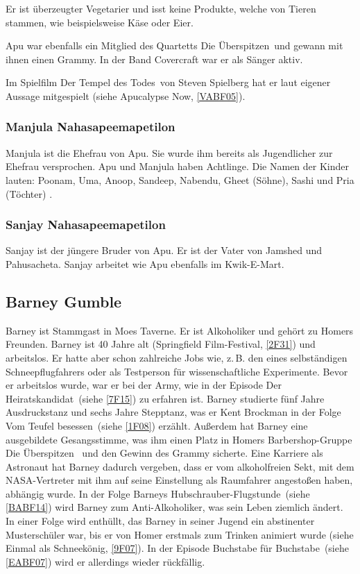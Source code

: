 Er ist überzeugter Vegetarier und isst keine Produkte, welche von Tieren stammen, wie beispielsweise Käse oder Eier.

Apu war ebenfalls ein Mitglied des Quartetts \glqq Die Überspitzen\grqq\ und gewann mit ihnen einen Grammy. In der Band Covercraft war er als Sänger aktiv.

Im Spielfilm \glqq Der Tempel des Todes\grqq\ von Steven Spielberg hat er laut eigener Aussage mitgespielt (siehe \glqq Apucalypse Now\grqq , \ref{VABF05}).


\subsubsection{Manjula Nahasapeemapetilon}
Manjula ist die Ehefrau von Apu. Sie wurde ihm bereits als Jugendlicher zur Ehefrau versprochen. Apu und Manjula haben Achtlinge. Die Namen der Kinder lauten:
Poonam, Uma, Anoop, Sandeep, Nabendu, Gheet (Söhne), Sashi und Pria (Töchter) \cite{SpringfieldAt}.

\subsubsection{Sanjay Nahasapeemapetilon}\label{NahasapeemapetilonSanjay}
Sanjay ist der jüngere Bruder von Apu. Er ist der Vater von Jamshed und Pahusacheta. Sanjay arbeitet wie Apu ebenfalls im Kwik-E-Mart.


\subsection{Barney Gumble}
Barney ist Stammgast in Moes Taverne. Er ist Alkoholiker und gehört zu Homers Freunden. Barney ist 40 Jahre alt (\glqq Springfield Film-Festival\grqq , \ref{2F31}) und arbeitslos. Er hatte aber schon zahlreiche Jobs wie, z.\,B. den eines selbständigen Schneepflugfahrers oder als Testperson für wissenschaftliche Experimente. Bevor er arbeitslos wurde, war er bei der Army, wie in der Episode \glqq Der Heiratskandidat\grqq\ (siehe \ref{7F15}) zu erfahren ist. Barney studierte fünf Jahre Ausdruckstanz und sechs Jahre Stepptanz, was er Kent Brockman in der Folge \glqq Vom Teufel besessen\grqq\ (siehe \ref{1F08}) erzählt. Außerdem hat Barney eine ausgebildete Gesangsstimme, was ihm einen Platz in Homers Barbershop-Gruppe \glqq Die Überspitzen\grqq\  und den Gewinn des Grammy sicherte. Eine Karriere als Astronaut hat Barney dadurch vergeben, dass er vom alkoholfreien Sekt, mit dem NASA-Vertreter mit ihm auf seine Einstellung als Raumfahrer angestoßen haben, abhängig wurde. In der Folge \glqq Barneys Hubschrauber-Flugstunde\grqq\ (siehe \ref{BABF14}) wird Barney zum Anti-Alkoholiker, was sein Leben ziemlich ändert. In einer Folge wird enthüllt, das Barney in seiner Jugend ein abstinenter Musterschüler war, bis er von Homer erstmals zum Trinken animiert wurde (siehe \glqq Einmal als Schneekönig\grqq , \ref{9F07}). In der Episode \glqq Buchstabe für Buchstabe\grqq\ (siehe \ref{EABF07}) wird er allerdings wieder rückfällig.


